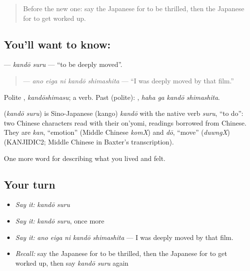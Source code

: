 \begin{quote}
Before the new one: say the Japanese for to be thrilled, then the Japanese for to get worked up.
\end{quote}

\subsection*{You'll want to know: }
\textbf{} — \emph{kandō suru} — \textquotedblleft{}to be deeply moved\textquotedblright{}.

\begin{quote}
\textbf{  } — \emph{ano eiga ni kandō shimashita} — \textquotedblleft{}I was deeply moved by that film.\textquotedblright{}
\end{quote}

Polite \textbf{}, \emph{kandōshimasu}; a  verb. Past (polite): \textbf{ }, \emph{haha ga kandō shimashita}.

\begin{cousinweb}
\textbf{} (\emph{kandō suru}) is Sino-Japanese (kango) \emph{kandō} with the native verb \emph{suru}, \textquotedblleft{}to do\textquotedblright{}: two Chinese characters read with their on'yomi, readings borrowed from Chinese. They are \emph{kan}, \textquotedblleft{}emotion\textquotedblright{} (Middle Chinese \emph{komX}) and \emph{dō}, \textquotedblleft{}move\textquotedblright{} (\emph{duwngX}) (KANJIDIC2; Middle Chinese in Baxter's transcription).
\end{cousinweb}

\begin{grammarlens}[title={What you've built}]
One more word for describing what you lived and felt.
\end{grammarlens}

\subsection*{Your turn}
\begin{itemize}
\raggedright
  \item \emph{Say it:} \emph{kandō suru}
  \item \emph{Say it:} \emph{kandō suru}, once more
  \item \emph{Say it:} \emph{ano eiga ni kandō shimashita} — I was deeply moved by that film.
  \item \emph{Recall:} say the Japanese for to be thrilled, then the Japanese for to get worked up, then say \emph{kandō suru} again
\end{itemize}

